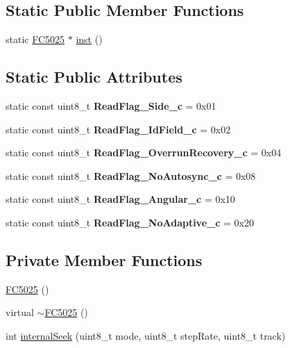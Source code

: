\subsection*{Static Public Member Functions}
\begin{DoxyCompactItemize}
\item 
static \hyperlink{classFC5025}{F\+C5025} $\ast$ \hyperlink{classFC5025_a3fa1262c4bde8788a2d71d07dfc88630}{inst} ()
\end{DoxyCompactItemize}
\subsection*{Static Public Attributes}
\begin{DoxyCompactItemize}
\item 
\hypertarget{classFC5025_a81fe505f0571c2840b5ac3a0e055d510}{}static const uint8\+\_\+t {\bfseries Read\+Flag\+\_\+\+Side\+\_\+c} = 0x01\label{classFC5025_a81fe505f0571c2840b5ac3a0e055d510}

\item 
\hypertarget{classFC5025_a41fd525aaaa28348be523122c2dd5c63}{}static const uint8\+\_\+t {\bfseries Read\+Flag\+\_\+\+Id\+Field\+\_\+c} = 0x02\label{classFC5025_a41fd525aaaa28348be523122c2dd5c63}

\item 
\hypertarget{classFC5025_a40dc0e101b49a93d22ab60398dc55ca1}{}static const uint8\+\_\+t {\bfseries Read\+Flag\+\_\+\+Overrun\+Recovery\+\_\+c} = 0x04\label{classFC5025_a40dc0e101b49a93d22ab60398dc55ca1}

\item 
\hypertarget{classFC5025_a1a862121d6b98c13b3cc4249cee333ea}{}static const uint8\+\_\+t {\bfseries Read\+Flag\+\_\+\+No\+Autosync\+\_\+c} = 0x08\label{classFC5025_a1a862121d6b98c13b3cc4249cee333ea}

\item 
\hypertarget{classFC5025_aaf2e391a9013cb2fc59dc7ca2559a437}{}static const uint8\+\_\+t {\bfseries Read\+Flag\+\_\+\+Angular\+\_\+c} = 0x10\label{classFC5025_aaf2e391a9013cb2fc59dc7ca2559a437}

\item 
\hypertarget{classFC5025_ac3fdb86284d3dc63ef845b4c4dc66ec6}{}static const uint8\+\_\+t {\bfseries Read\+Flag\+\_\+\+No\+Adaptive\+\_\+c} = 0x20\label{classFC5025_ac3fdb86284d3dc63ef845b4c4dc66ec6}

\end{DoxyCompactItemize}
\subsection*{Private Member Functions}
\begin{DoxyCompactItemize}
\item 
\hyperlink{classFC5025_a01786b9fd3a20919da5e702794fa95e6}{F\+C5025} ()
\item 
virtual \hyperlink{classFC5025_a5ceae55a353876d38857b965e87e6aeb}{$\sim$\+F\+C5025} ()
\item 
int \hyperlink{classFC5025_ad03589bd35682da51fe0cb2e7523688d}{internal\+Seek} (uint8\+\_\+t mode, uint8\+\_\+t step\+Rate, uint8\+\_\+t track)
\end{DoxyCompactItemize}
